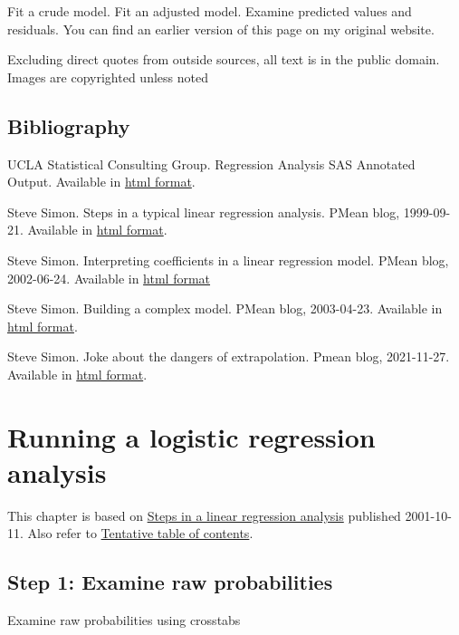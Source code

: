 \documentclass[
  letterpaper,
  DIV=11,
  numbers=noendperiod]{scrreprt}
\begin{document}
Fit a crude model. Fit an adjusted model. Examine predicted values and
residuals. You can find an earlier version of this page on my original
website.

Excluding direct quotes from outside sources, all text is in the public
domain. Images are copyrighted unless noted

\section{Bibliography}\label{bibliography-3}

UCLA Statistical Consulting Group. Regression Analysis \textbar{} SAS
Annotated Output. Available in
\href{https://stats.oarc.ucla.edu/sas/output/regression-analysis/}{html
format}.

Steve Simon. Steps in a typical linear regression analysis. PMean blog,
1999-09-21. Available in
\href{http://new.pmean.com/steps-in-linear-regression/}{html format}.

Steve Simon. Interpreting coefficients in a linear regression model.
PMean blog, 2002-06-24. Available in
\href{http://new.pmean.com/intepreting-linear-regression-coefficients/}{html
format}

Steve Simon. Building a complex model. PMean blog, 2003-04-23. Available
in \href{http://new.pmean.com/building-complex-models/}{html format}.

Steve Simon. Joke about the dangers of extrapolation. Pmean blog,
2021-11-27. Available in
\href{http://new.pmean.com/extrapolation-joke/}{html format}.


\chapter{Running a logistic regression
analysis}\label{running-a-logistic-regression-analysis}

This chapter is based on
\href{http://new.pmean.com/steps-in-linear-regression/}{Steps in a
linear regression analysis} published 2001-10-11. Also refer to
\href{http://www.pmean.com/10/Contents.html}{Tentative table of
contents}.

\section{Step 1: Examine raw
probabilities}\label{step-1-examine-raw-probabilities}

Examine raw probabilities using crosstabs
\end{document}
